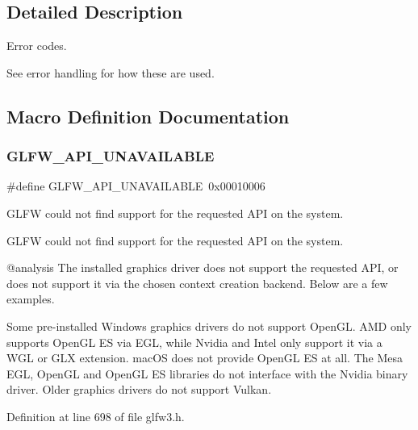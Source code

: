 \subsection{Detailed Description}
Error codes. 

See error handling for how these are used. 

\subsection{Macro Definition Documentation}
\mbox{\label{group__errors_ga56882b290db23261cc6c053c40c2d08e}} 
\subsubsection{\texorpdfstring{GLFW\_API\_UNAVAILABLE}{GLFW\_API\_UNAVAILABLE}}
{\footnotesize\ttfamily \#define G\+L\+F\+W\+\_\+\+A\+P\+I\+\_\+\+U\+N\+A\+V\+A\+I\+L\+A\+B\+LE~0x00010006}



G\+L\+FW could not find support for the requested A\+PI on the system. 

G\+L\+FW could not find support for the requested A\+PI on the system.

@analysis The installed graphics driver does not support the requested A\+PI, or does not support it via the chosen context creation backend. Below are a few examples.

\begin{DoxyParagraph}{}
Some pre-\/installed Windows graphics drivers do not support Open\+GL. A\+MD only supports Open\+GL ES via E\+GL, while Nvidia and Intel only support it via a W\+GL or G\+LX extension. mac\+OS does not provide Open\+GL ES at all. The Mesa E\+GL, Open\+GL and Open\+GL ES libraries do not interface with the Nvidia binary driver. Older graphics drivers do not support Vulkan. 
\end{DoxyParagraph}


Definition at line 698 of file glfw3.\+h.

\mbox{\label{group__errors_ga196e125ef261d94184e2b55c05762f14}} 
